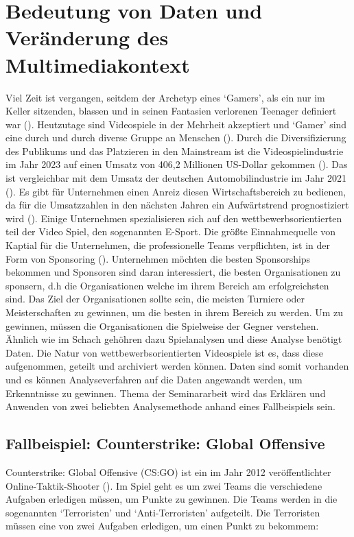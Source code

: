 \documentclass[envcountsame, envcountchap, deutsch]{i-studis}
\begin{document}
\section{Bedeutung von Daten und Veränderung des Multimediakontext}
Viel Zeit ist vergangen, seitdem der Archetyp eines `Gamers', als ein nur im Keller sitzenden, blassen und in seinen Fantasien verlorenen Teenager 
definiert war (\cite{Kowert_2014}). Heutzutage sind Videospiele in der Mehrheit akzeptiert und 
`Gamer' sind eine durch und durch diverse Gruppe an Menschen (\cite{Williams_2008}).
Durch die Diversifizierung des Publikums und das Platzieren in den Mainstream ist die Videospielindustrie im Jahr 2023 auf einen Umsatz von
406,2 Millionen US-Dollar gekommen (\cite{Clement_2023}). Das ist vergleichbar mit dem Umsatz der deutschen Automobilindustrie im Jahr 2021 (\cite{Klimaschutz_2023}). Es gibt 
für Unternehmen einen Anreiz diesen Wirtschaftsbereich zu bedienen, da für die Umsatzzahlen in den nächsten Jahren ein Aufwärtstrend 
prognostiziert wird (\cite{Clement_2023}). Einige Unternehmen spezialisieren sich auf den wettbewerbsorientierten teil der Video Spiel, den sogenannten E-Sport. 
Die größte Einnahmequelle von Kaptial für die Unternehmen, die professionelle Teams verpflichten, ist in der Form von Sponsoring (\cite{Tristão_2022}).
Unternehmen möchten die besten Sponsorships bekommen und Sponsoren sind daran interessiert,
die besten Organisationen zu sponsern, d.h die Organisationen welche im ihrem Bereich am erfolgreichsten sind. Das Ziel der Organisationen sollte
sein, die meisten Turniere oder Meisterschaften zu gewinnen, um die besten in ihrem Bereich zu werden. Um zu gewinnen, 
müssen die Organisationen die Spielweise der Gegner verstehen. 
Ähnlich wie im Schach gehöhren dazu Spielanalysen und diese Analyse benötigt Daten. Die Natur von wettbewerbsorientierten Videospiele ist es, dass diese aufgenommen, 
geteilt und archiviert werden können. 
Daten sind somit vorhanden und es können Analyseverfahren auf die Daten angewandt werden, um Erkenntnisse zu gewinnen.
Thema der Seminararbeit wird das Erklären und Anwenden von zwei beliebten Analysemethode anhand eines Fallbeispiels sein. 
\subsection{Fallbeispiel: Counterstrike: Global Offensive}

Counterstrike: Global Offensive (CS:GO) ist ein im Jahr 2012 veröffentlichter Online-Taktik-Shooter (\cite{Coropration_2012}).
Im Spiel geht es um zwei Teams die verschiedene Aufgaben erledigen müssen, um Punkte zu gewinnen. 
Die Teams werden in die sogenannten `Terroristen' und `Anti-Terroristen' aufgeteilt.
Die Terroristen müssen eine von zwei Aufgaben erledigen, um einen Punkt zu bekommem:
\end{document}
